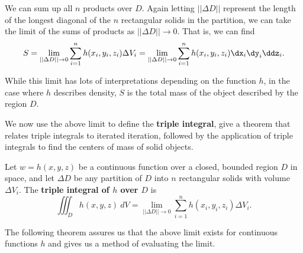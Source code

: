 We can sum up all $n$ products over $D$. Again letting $||\Delta D||$ represent the length of the longest diagonal of the $n$ rectangular solids in the partition, we can take the limit of the sums of products as $||\Delta D||\to 0$. That is, we can find
$$ S = \lim_{||\Delta D||\to 0} \sum_{i=1}^n h(x_i,y_i,z_i)\Delta V_i=\lim_{||\Delta D||\to 0} \sum_{i=1}^n h(x_i,y_i,z_i)\dx_i\dy_i\ddz_i.$$

While this limit has lots of interpretations depending on the function $h$, in the case where $h$ describes density, $S$ is the total mass of the object described by the region $D$.

We now use the above limit to define the \textbf{triple integral}, give a theorem that relates triple integrals to iterated iteration, followed by the application of triple integrals to find the centers of mass of solid objects.

{Let $w=h(x,y,z)$ be a continuous function over a closed, bounded region $D$ in space, and let $\Delta D$ be any partition of $D$ into $n$ rectangular solids with volume $\Delta V_i$. The \textbf{triple integral of $h$ over $D$} is
$$\iiint_Dh(x,y,z)\ dV = \lim_{||\Delta D||\to 0}\sum_{i=1}^n h(x_i,y_i,z_i)\Delta V_i.$$
}


The following theorem assures us that the above limit exists for continuous functions $h$ and gives us a method of evaluating the limit.


